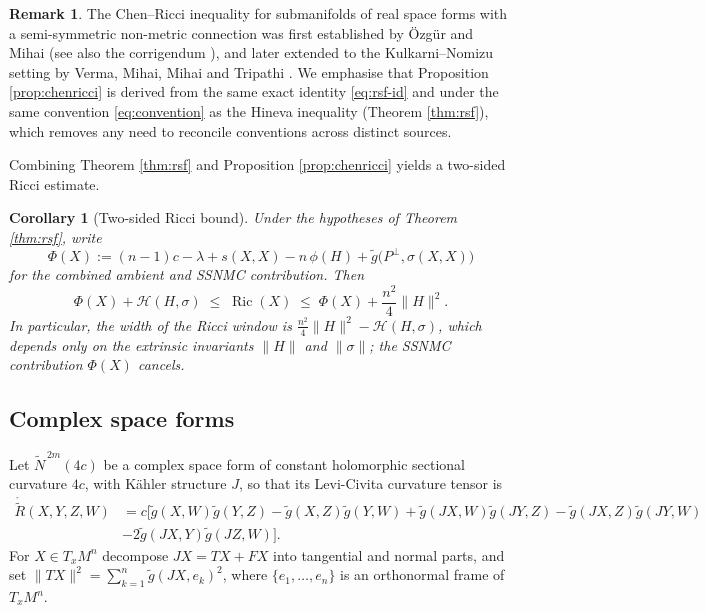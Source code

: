 \documentclass[11pt]{article}
\newtheorem{corollary}[theorem]{Corollary}
\theoremstyle{definition}
\newtheorem{remark}[theorem]{Remark}
\newcommand{\tN}{\widetilde{N}}
\newcommand{\tg}{\widetilde{g}}
\newcommand{\ctR}{\mathring{\widetilde{R}}}
\newcommand{\Ric}{\operatorname{Ric}}
\newcommand{\HH}{\mathcal{H}}
\begin{document}
\begin{remark}\label{rem:chenricci-hist}
The Chen--Ricci inequality for submanifolds of real space forms with a semi-symmetric non-metric connection was first established by \"Ozg\"ur and Mihai \cite{OM1} (see also the corrigendum \cite{OM2}), and later extended to the Kulkarni--Nomizu setting by Verma, Mihai, Mihai and Tripathi \cite{Verma1,Verma2}. We emphasise that Proposition \ref{prop:chenricci} is derived from the same exact identity \eqref{eq:rsf-id} and under the same convention \eqref{eq:convention} as the Hineva inequality (Theorem \ref{thm:rsf}), which removes any need to reconcile conventions across distinct sources.
\end{remark}

Combining Theorem \ref{thm:rsf} and Proposition \ref{prop:chenricci} yields a two-sided Ricci estimate.

\begin{corollary}[Two-sided Ricci bound]\label{cor:twosided}
Under the hypotheses of Theorem \ref{thm:rsf}, write
\[
\Phi(X):=(n-1)c-\lambda+s(X,X)-n\,\phi(H)+\tg\bigl(P^\perp,\sigma(X,X)\bigr)
\]
for the combined ambient and SSNMC contribution. Then
\begin{equation}\label{eq:twosided}
\Phi(X)+\HH(H,\sigma)\;\le\;\Ric(X)\;\le\;\Phi(X)+\frac{n^2}{4}\|H\|^2.
\end{equation}
In particular, the width of the Ricci window is $\frac{n^2}{4}\|H\|^2-\HH(H,\sigma)$, which depends only on the extrinsic invariants $\|H\|$ and $\|\sigma\|$; the SSNMC contribution $\Phi(X)$ cancels.
\end{corollary}

\subsection{Complex space forms}

Let $\tN^{\,2m}(4c)$ be a complex space form of constant holomorphic sectional curvature $4c$, with K\"ahler structure $J$, so that its Levi-Civita curvature tensor is
\begin{align*}
    \ctR(X,Y,Z,W)&=c\bigl[\tg(X,W)\tg(Y,Z)-\tg(X,Z)\tg(Y,W)+\tg(JX,W)\tg(JY,Z)-\tg(JX,Z)\tg(JY,W)\\
    &-2\tg(JX,Y)\tg(JZ,W)\bigr].
\end{align*}
For $X\in T_xM^n$ decompose $JX=TX+FX$ into tangential and normal parts, and set $\|TX\|^2=\sum_{k=1}^{n}\tg(JX,e_k)^2$, where $\{e_1,\dots,e_n\}$ is an orthonormal frame of $T_xM^n$.
\end{document}
